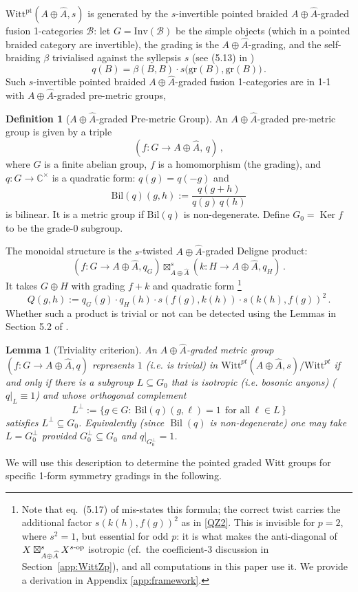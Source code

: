 \documentclass[aps,twocolumn,prx,floatfix,preprintnumbers, nofootinbib,10pt]{revtex4-2}
\numberwithin{equation}{section}
\newtheorem{lemma}[theorem]{Lemma}
\theoremstyle{definition}
\newtheorem{definition}[theorem]{Definition}
\theoremstyle{remark}
\theoremstyle{claim}
\newcommand{\be}{\begin{equation}}
\newcommand{\ee}{\end{equation}}
\renewcommand{\ker}{\operatorname{Ker}}
\newcommand{\Bil}{\operatorname{Bil}}
\newcommand{\Witt}{\text{Witt}}
\newcommand{\pt}{\text{pt}}
\newcommand{\abeliangrp}{A \oplus \widehat{A}}
\begin{document}
$\Witt^{\pt}({A \oplus \widehat{A}}, s)$ is generated by the $s$-invertible pointed braided
${A \oplus \widehat{A}}$-graded fusion 1-categories $\mathcal{B}$: let $G=\text{Inv}(\mathcal{B})$ be the {simple} objects (which in a {pointed} braided category are invertible), the  grading is the
${A \oplus \widehat{A}}$-grading, and the self-braiding $\beta$ trivialised against the syllepsis $s$ (see (5.13) in \cite{Bhardwaj:2024xcx})
\be
 q(B)=\beta(B,B)\cdot s\big(\text{gr}(B),\text{gr}(B)\big) \,.
\ee
Such $s$-invertible pointed braided $\abeliangrp$-graded fusion 1-categories are in 1-1 with $\abeliangrp$-graded pre-metric groups, 
\begin{definition}[$\abeliangrp$-graded Pre-metric Group]\label{def:graded_premetric}
An $\abeliangrp$-graded pre-metric group is given by a triple 
\be 
(f: G\to \abeliangrp,\,q)\,,
\ee
where $G$ is a finite abelian group, $f$ is a homomorphism (the grading), and
$q: G \to \mathbb{C}^\times$ is a {quadratic form}: $q(g)=q(-g)$ and
\be
  \text{Bil}(q)(g,h):=\frac{q(g+h)}{q(g)\,q(h)}
\ee
is bilinear. It is a metric group if $\text{Bil}(q)$ is non-degenerate. Define $G_0=\ker f$ to be the grade-$0$ subgroup.
\end{definition}


The monoidal structure is the $s$-twisted ${A \oplus \widehat{A}}$-graded Deligne product: 
\be
\left(f: G \rightarrow {A \oplus \widehat{A}}, q_G\right) \boxtimes_{A \oplus \widehat{A}}^s\left(k: H \rightarrow {A \oplus \widehat{A}}, q_H\right) \,.
\ee
It takes $G\oplus H$ with grading
$f + k$ and quadratic form
\footnote{Note that eq.~(5.17) of \cite{Bhardwaj:2024xcx} mis-states this formula; the correct twist carries the additional factor $s(k(h),f(g))^2$ as in \eqref{QZ2}.  This is invisible for $p=2$, where $s^2=1$, but essential for odd $p$: it is what makes the anti-diagonal of $X\boxtimes^s_{A \oplus \widehat{A}} X^{s\text{-}\rm op}$ isotropic (cf.\ the coefficient-$3$ discussion in Section~\ref{app:WittZp}), and all computations in this paper use it. We provide a derivation in Appendix \ref{app:framework}.}
\be\label{QZ2}
Q(g , h):=q_G(g) \cdot q_H(h) \cdot s(f(g), k(h)) \cdot s( k(h), f(g))^2 \,.
\ee
Whether such a product is trivial or not can be detected using 
the Lemmas in Section 5.2 of \cite{Bhardwaj:2024xcx}. 
\begin{lemma}[Triviality criterion]\label{lem:criterion}
An $\abeliangrp$-graded metric group $(f: G\to \abeliangrp, q)$ represents $1$ (i.e. is trivial) in $\Witt^{pt}(\abeliangrp, s)/\Witt^{pt}$ if and only if
there is a subgroup $L \subseteq G_0$ that is {isotropic (i.e. bosonic anyons)} ($q|_L \equiv 1$) and whose orthogonal
complement
\be
  L^{\perp}:=\{ g\in G:\ \text{Bil}(q)(g,\ell)=1\ \ \text{for all}\ \ell\in L\,\}
\ee
satisfies $L^{\perp}\subseteq G_0$.
Equivalently (since $\Bil(q)$ is non-degenerate) one may take $L=G_0^{\perp}$ provided
$G_0^{\perp}\subseteq G_0$ and $q|_{G_0^{\perp}} =1$.
\end{lemma}
We will use this description to determine the pointed graded Witt groups for specific 1-form symmetry gradings in the following. 
\end{document}

